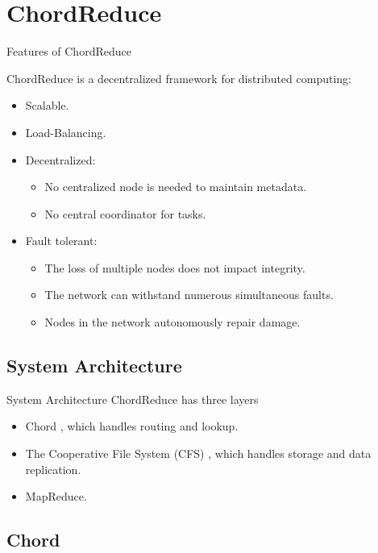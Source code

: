 \documentclass[11pt]{beamer}
\begin{document}
\section{ChordReduce}


\begin{frame}{Features of ChordReduce}

ChordReduce is a decentralized framework for distributed computing:
\begin{itemize}
	\item Scalable.
	\item Load-Balancing.
	\item Decentralized:
	\begin{itemize}
		\item No centralized node is needed to maintain metadata.
		\item No central coordinator for tasks.
	\end{itemize}
	\item Fault tolerant:
	\begin{itemize}
		\item The loss of multiple nodes does not impact integrity.
		\item The network can withstand numerous simultaneous faults.
		\item Nodes in the network autonomously repair damage.
	\end{itemize}
	
\end{itemize}

\end{frame}



\subsection{System Architecture}
\begin{frame}{System Architecture}
ChordReduce has three layers
\begin{itemize}
	\item Chord \cite{Chord}, which handles routing and lookup.
	\item The Cooperative File System (CFS) \cite{CFS}, which handles storage and data replication.
	\item MapReduce.
\end{itemize}

\end{frame}

\subsection{Chord}
\end{document}
